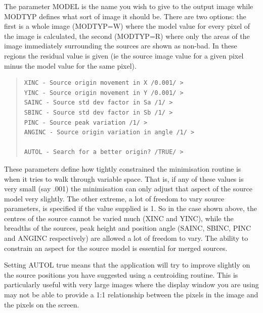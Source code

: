 \documentclass[twoside,11pt]{article}
\newenvironment{myquote}{\begin{quote}\begin{small}}{\end{small}\end{quote}}
\begin{document}
The parameter MODEL is the name you wish to give to the output image while
MODTYP defines what sort of image it should be. There are two options: the
first is a whole image (MODTYP=W) where the model value for every pixel of the
image is calculated, the second (MODTYP=R) where only the areas of the image
immediately surrounding the sources are shown as non-bad. In these regions the
residual value is given (ie the source image value for a given pixel
minus the model value for the same pixel).

\begin{myquote}
\begin{verbatim}
XINC - Source origin movement in X /0.001/ >
YINC - Source origin movement in Y /0.001/ >
SAINC - Source std dev factor in Sa /1/ >
SBINC - Source std dev factor in Sb /1/ >
PINC - Source peak variation /1/ >
ANGINC - Source origin variation in angle /1/ >

AUTOL - Search for a better origin? /TRUE/ >
\end{verbatim}
\end{myquote}


These parameters define how tightly constrained the minimisation routine
is when it tries to walk through variable space. That is, if any of these
values is very small (say .001) the minimisation can only adjust that
aspect of the source model very slightly. The other extreme, a lot of freedom
to vary source parameters, is specified if the value supplied is 1. So in the
case shown above, the centres of the source cannot be varied
much (XINC and YINC), while the breadths of the sources, peak height and
position angle (SAINC, SBINC, PINC and ANGINC respectively) are allowed
a lot of freedom to vary. The ability to constrain an aspect for the
source model is essential for merged sources.

Setting AUTOL true means that the application will try to improve slightly
on the source positions you have suggested using a centroiding routine.
This is particularly useful with very large images where the display
window you
are using may not be able to provide a 1:1 relationship between the
pixels in the image and the pixels on the screen.
\end{document}
